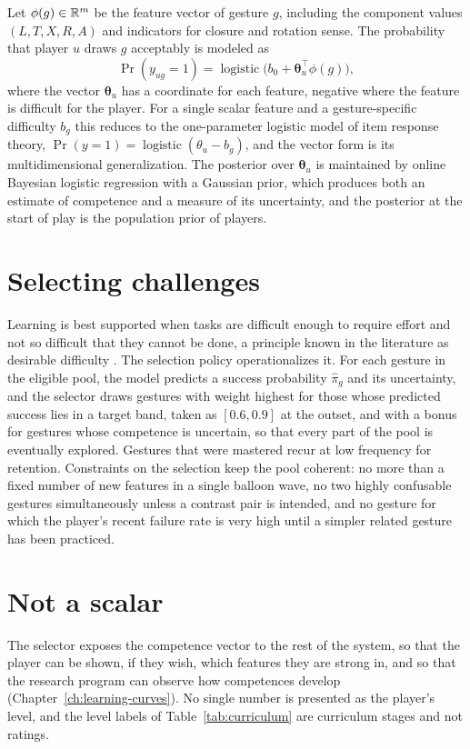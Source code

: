 Let $\phi(g)\in\mathbb{R}^m$ be the feature vector of gesture $g$, including the component values $(L,T,X,R,A)$ and indicators for closure and rotation sense. The probability that player $u$ draws $g$ acceptably is modeled as
\[
\Pr(y_{ug}=1)=\operatorname{logistic}\bigl(b_0+\boldsymbol\theta_u^{\top}\phi(g)\bigr),
\]
where the vector $\boldsymbol\theta_u$ has a coordinate for each feature, negative where the feature is difficult for the player. For a single scalar feature and a gesture-specific difficulty $b_g$ this reduces to the one-parameter logistic model of item response theory, $\Pr(y=1)=\operatorname{logistic}(\theta_u-b_g)$, and the vector form is its multidimensional generalization.\evS{} The posterior over $\boldsymbol\theta_u$ is maintained by online Bayesian logistic regression with a Gaussian prior, which produces both an estimate of competence and a measure of its uncertainty, and the posterior at the start of play is the population prior of players.

\section{Selecting challenges}

Learning is best supported when tasks are difficult enough to require effort and not so difficult that they cannot be done, a principle known in the literature as desirable difficulty \cite{bjork1994}.\evD{} The selection policy operationalizes it. For each gesture in the eligible pool, the model predicts a success probability $\hat\pi_g$ and its uncertainty, and the selector draws gestures with weight highest for those whose predicted success lies in a target band, taken as $[0.6,0.9]$ at the outset, and with a bonus for gestures whose competence is uncertain, so that every part of the pool is eventually explored. Gestures that were mastered recur at low frequency for retention. Constraints on the selection keep the pool coherent: no more than a fixed number of new features in a single balloon wave, no two highly confusable gestures simultaneously unless a contrast pair is intended, and no gesture for which the player's recent failure rate is very high until a simpler related gesture has been practiced.

\section{Not a scalar}

The selector exposes the competence vector to the rest of the system, so that the player can be shown, if they wish, which features they are strong in, and so that the research program can observe how competences develop (Chapter~\ref{ch:learning-curves}). No single number is presented as the player's level, and the level labels of Table~\ref{tab:curriculum} are curriculum stages and not ratings.

